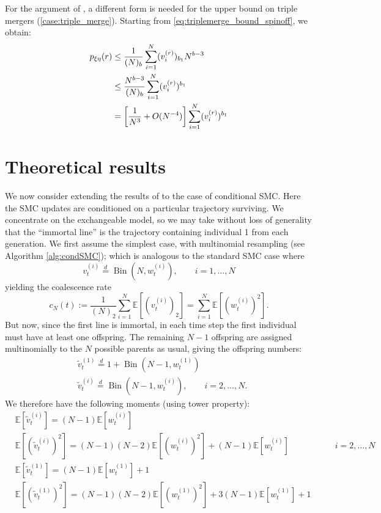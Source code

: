\documentclass{article}
\newcommand{\E}{\mathbb{E}}
\newcommand{\vt}[2][t]{v_{#1}^{(#2)}}
\newcommand{\vttilde}[2][t]{\tilde{v}_{#1}^{(#2)}}
\newcommand{\wt}[2][t]{w_{#1}^{(#2)}}
\newcommand{\eqdist}{\overset{d}{=}}
\newcommand{\Bin}{\operatorname{Bin}}
\begin{document}
For the argument of \citet{koskela2018}, a different form is needed for the upper bound on triple mergers (\ref{case:triple_merge}). Starting from \eqref{eq:triplemerge_bound_spinoff}, we obtain:
\begin{align}
p_{\xi\eta}(r) &\leq \frac{1}{(N)_b} \sum_{i=1}^{N} (v_{i}^{(r)})_{b_1} N^{b-3} \notag\\
&\leq \frac{N^{b-3}}{(N)_b} \sum_{i=1}^{N} (v_{i}^{(r)})^{b_1} \notag\\
&= \left[ \frac{1}{N^3} + O(N^{-4}) \right] \sum_{i=1}^{N} (v_{i}^{(r)})^{b_1}
\end{align}


\section{Theoretical results}\label{sec:theory}
We now consider extending the results of \citet{koskela2018} to the case of conditional SMC.
Here the SMC updates are conditioned on a particular trajectory surviving. We concentrate on the exchangeable model, so we may take without loss of generality that the ``immortal line'' is the trajectory containing individual 1 from each generation.
We first assume the simplest case, with multinomial resampling (see Algorithm \ref{alg:condSMC}); which is analogous to the standard SMC case where
\begin{equation*}
\vt{i} \eqdist \Bin (N, \wt{i}), \qquad i=1,\dots,N
\end{equation*}
yielding the coalescence rate
\begin{equation}
c_N(t) := \frac{1}{(N)_2} \sum_{i=1}^{N} \E\left[ (\vt{i})_2 \right] = \sum_{i=1}^{N} \E\left[(\wt{i})^2\right].
\end{equation}
But now, since the first line is immortal, in each time step the first individual must have at least one offspring. The remaining $N-1$ offspring are assigned multinomially to the $N$ possible parents as usual, giving the offspring numbers:
\begin{align*}
& \vttilde{1} \eqdist 1 + \Bin(N-1, \wt{1}) \\
& \vttilde{i} \eqdist \Bin(N-1, \wt{i}), \qquad i=2,\dots,N.
\end{align*}
We therefore have the following moments (using tower property):
\begin{align*}
& \E[\vttilde{i}] = (N-1)\E[\wt{i}] &\\
& \E[(\vttilde{i})^2] = (N-1)(N-2)\E[(\wt{i})^2] + (N-1)\E[\wt{i}] &\qquad i=2,\dots,N \\
& \E[\vttilde{1}] = (N-1)\E[\wt{1}] + 1 \\
& \E[(\vttilde{1})^2] = (N-1)(N-2)\E[(\wt{1})^2] + 3(N-1)\E[\wt{1}] + 1 &
\end{align*}
\end{document}
